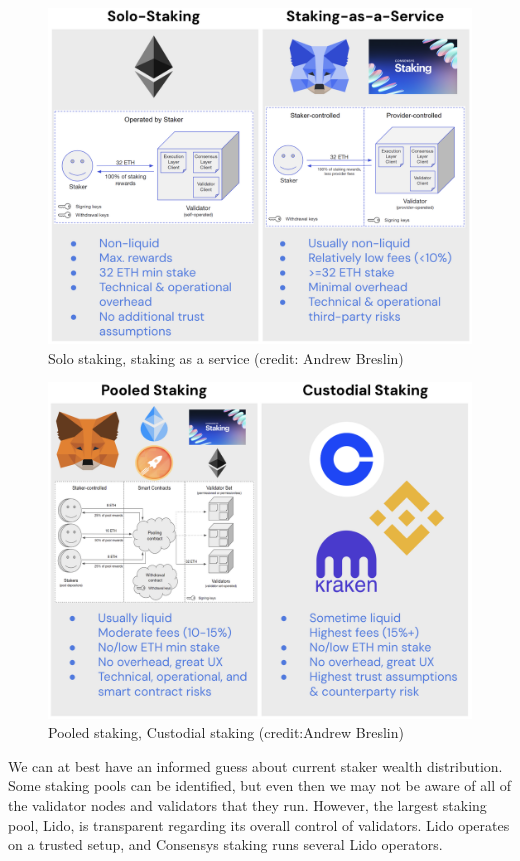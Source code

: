 \documentclass[UTF8]{article}
\begin{document}
\begin{figure}[htbp]
\begin{center}
\includegraphics[width=0.7\linewidth]{images/solo-saas}
\caption{Solo staking, staking as a service (credit: Andrew Breslin)}
\label{fig:solo}
\end{center}
\end{figure}

\begin{figure}[htbp]
\begin{center}
\includegraphics[width=0.7\linewidth]{images/pooled-custodial}
\caption{Pooled staking, Custodial staking (credit:Andrew Breslin)}
\label{fig:pooled}
\end{center}
\end{figure}

We can at best have an informed guess about current staker wealth distribution. Some staking pools can be identified, but even then we may not be aware of all of the validator nodes and validators that they run. However, the largest staking pool, Lido, is transparent regarding its overall control of validators. Lido operates on a trusted setup, and Consensys staking runs several Lido operators. 
\end{document}
